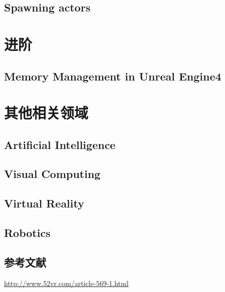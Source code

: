 \documentclass[UTF8,a4paper,12pt]{ctexbook}
\begin{document}
	
	\section{Spawning actors}
	
	
	


\chapter{进阶}
	
	\section{Memory Management in Unreal Engine4}
	


	
\chapter{其他相关领域}
	\section{Artificial Intelligence}	
	
	\section{Visual Computing}	
	
	\section{Virtual Reality}
	
	\section{Robotics}
	
	\section{参考文献} \url{http://www.52vr.com/article-569-1.html}
	    
\end{document}
